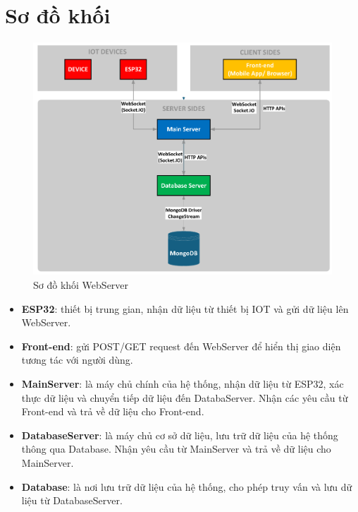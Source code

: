     \section{Sơ đồ khối}
        \begin{figure}[H]
            \centering
            \includegraphics[width=1\textwidth]{pictures/OverviewDiagram.png}
            \caption{Sơ đồ khối WebServer}
            \label{fig:overview_diagram} 
        \end{figure}
        \begin{itemize}
            \item \textbf{ESP32}: thiết bị trung gian, nhận dữ liệu từ thiết bị IOT và gửi dữ liệu lên WebServer.
            \item \textbf{Front-end}: gửi POST/GET request đến WebServer để hiển thị giao diện tương tác với người dùng. 
            \item \textbf{MainServer}: là máy chủ chính của hệ thống, nhận dữ liệu từ ESP32, xác thực dữ liệu và chuyển tiếp dữ liệu đến DatabaServer. Nhận các yêu cầu từ Front-end và trả về dữ liệu cho Front-end.
            \item \textbf{DatabaseServer}: là máy chủ cơ sở dữ liệu, lưu trữ dữ liệu của hệ thống thông qua Database. Nhận yêu cầu từ MainServer và trả về dữ liệu cho MainServer.
            \item \textbf{Database}: là nơi lưu trữ dữ liệu của hệ thống, cho phép truy vấn và lưu dữ liệu từ DatabaseServer.
         \end{itemize}
